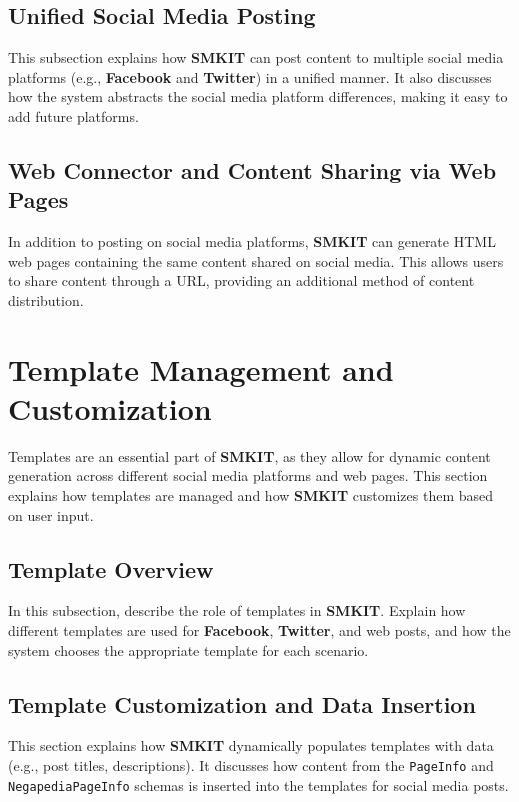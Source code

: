 \subsection{Unified Social Media Posting}
\label{subsec:unified_social_media_posting}
This subsection explains how \textbf{SMKIT} can post content to multiple social media platforms (e.g., \textbf{Facebook} and \textbf{Twitter}) in a unified manner. It also discusses how the system abstracts the social media platform differences, making it easy to add future platforms.

\subsection{Web Connector and Content Sharing via Web Pages}
\label{subsec:web_connector_content_sharing}
In addition to posting on social media platforms, \textbf{SMKIT} can generate HTML web pages containing the same content shared on social media. This allows users to share content through a URL, providing an additional method of content distribution.

\section{Template Management and Customization}
\label{sec:template_management_and_customization}
Templates are an essential part of \textbf{SMKIT}, as they allow for dynamic content generation across different social media platforms and web pages. This section explains how templates are managed and how \textbf{SMKIT} customizes them based on user input.

\subsection{Template Overview}
\label{subsec:template_overview}
In this subsection, describe the role of templates in \textbf{SMKIT}. Explain how different templates are used for \textbf{Facebook}, \textbf{Twitter}, and web posts, and how the system chooses the appropriate template for each scenario.

\subsection{Template Customization and Data Insertion}
\label{subsec:template_customization_and_data_insertion}
This section explains how \textbf{SMKIT} dynamically populates templates with data (e.g., post titles, descriptions). It discusses how content from the \texttt{PageInfo} and \texttt{NegapediaPageInfo} schemas is inserted into the templates for social media posts.

